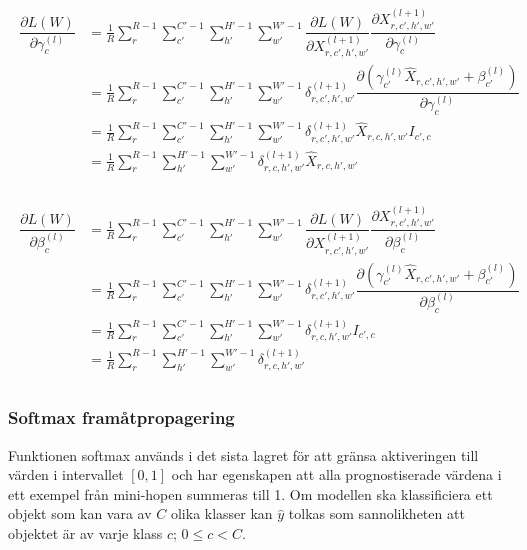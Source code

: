 \documentclass[a4paper,11pt,twoside]{article}
\newcommand*{\pd}[2]{\ensuremath{\dfrac{\partial #1}{\partial #2}}}
\begin{document}
\begin{align}
\begin{split}
	\pd{L(W)}{\gamma^{(l)}_{c}}
		& = \frac{1}{R}\sum^{R-1}_{r} \sum^{C'-1}_{c'} \sum^{H'-1}_{h'} \sum^{W'-1}_{w'} \pd{L(W)}{X^{(l+1)}_{r,c',h',w'}} \pd{X^{(l+1)}_{r,c',h',w'}}{\gamma^{(l)}_{c}} \\
		& = \frac{1}{R}\sum^{R-1}_{r} \sum^{C'-1}_{c'} \sum^{H'-1}_{h'} \sum^{W'-1}_{w'} \delta^{(l+1)}_{r,c',h',w'}  \pd{({\gamma_{c'}^{(l)} \hat{X}_{r,c',h',w'} + \beta_{c'}^{(l)}})}{\gamma^{(l)}_{c}} \\
		& = \frac{1}{R}\sum^{R-1}_{r} \sum^{C'-1}_{c'} \sum^{H'-1}_{h'} \sum^{W'-1}_{w'} \delta^{(l+1)}_{r,c',h',w'} \hat{X}_{r,c,h',w'} I_{c',c}\\
		& = \frac{1}{R}\sum^{R-1}_{r} \sum^{H'-1}_{h'} \sum^{W'-1}_{w'} \delta^{(l+1)}_{r,c,h',w'} \hat{X}_{r,c,h',w'} \\
\end{split}
\end{align}


\begin{align}
\begin{split}
	\pd{L(W)}{\beta^{(l)}_{c}}
		& = \frac{1}{R}\sum^{R-1}_{r} \sum^{C'-1}_{c'} \sum^{H'-1}_{h'} \sum^{W'-1}_{w'} \pd{L(W)}{X^{(l+1)}_{r,c',h',w'}} \pd{X^{(l+1)}_{r,c',h',w'}}{\beta^{(l)}_{c}} \\
		& = \frac{1}{R}\sum^{R-1}_{r} \sum^{C'-1}_{c'} \sum^{H'-1}_{h'} \sum^{W'-1}_{w'} \delta^{(l+1)}_{r,c',h',w'}  \pd{({\gamma_{c'}^{(l)} \hat{X}_{r,c',h',w'} + \beta_{c'}^{(l)}})}{\beta^{(l)}_{c}} \\
		& = \frac{1}{R}\sum^{R-1}_{r} \sum^{C'-1}_{c'} \sum^{H'-1}_{h'} \sum^{W'-1}_{w'} \delta^{(l+1)}_{r,c,h',w'} I_{c',c}\\
		& = \frac{1}{R}\sum^{R-1}_{r} \sum^{H'-1}_{h'} \sum^{W'-1}_{w'} \delta^{(l+1)}_{r,c,h',w'} \\
\end{split}
\end{align}

\subsubsection{Softmax framåtpropagering}
Funktionen softmax används i det sista lagret för att gränsa aktiveringen till värden i intervallet $[0,1]$ och har egenskapen att alla prognostiserade värdena i ett exempel från mini-hopen summeras till 1. Om modellen ska klassificiera ett objekt som kan vara av $C$ olika klasser kan $\hat{y}$ tolkas som sannolikheten att objektet är av varje klass $c$; $0 \leq c < C$. \cite{cs231n}
\end{document}
